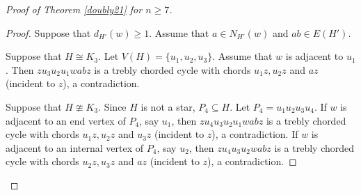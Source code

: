 \documentclass[12pt]{article}
\begin{document}
\begin{proof}[Proof of Theorem \ref{doubly21} for $n\ge 7$]
\begin{proof} 
Suppose that $d_{H'}(w)\ge 1$.
Assume that $a\in N_{H'}(w)$ and $ab\in E(H')$.

Suppose that $H\cong K_3$. Let $V(H)=\{u_1,u_2,u_3\}$. Assume that $w$ is adjacent to $u_1$. Then $zu_3u_2u_1wabz$ is a trebly chorded cycle with  chords $u_1z, u_2z$ and $az$ (incident to $z$), a contradiction.

Suppose that $H\ncong K_3$. Since $H$ is not a star, $P_4\subseteq H$. Let $P_4=u_1u_2u_3u_4$.
If $w$ is adjacent to an end vertex of $P_4$, say $u_1$, then $zu_4u_3u_2u_1wabz$ is a trebly chorded cycle with  chords $u_1z, u_2z$ and $u_3z$ (incident to $z$), a contradiction.
If $w$ is adjacent to an internal vertex of $P_4$, say $u_2$, then $zu_4u_3u_2wabz$ is a trebly chorded cycle with  chords $u_2z, u_3z$ and $az$ (incident to $z$), a contradiction.


\end{proof}
\end{proof}
\end{document}
